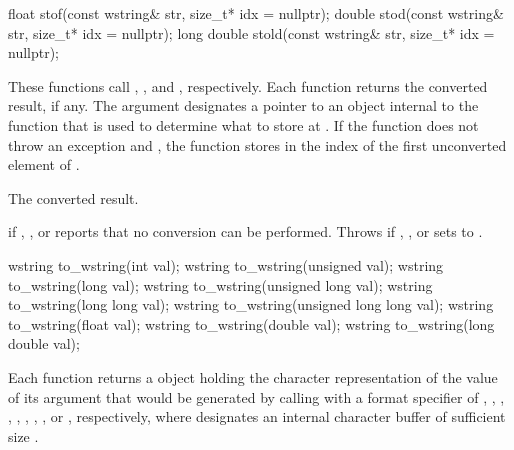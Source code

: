 %
%
%
\begin{itemdecl}
float stof(const wstring& str, size_t* idx = nullptr);
double stod(const wstring& str, size_t* idx = nullptr);
long double stold(const wstring& str, size_t* idx = nullptr);
\end{itemdecl}

\begin{itemdescr}
\pnum
\effects
These functions call ,
, and ,
respectively. Each function returns the converted
result, if any. The argument  designates a pointer to an object internal to
the function that is used to determine what to store at . If the function
does not throw an exception and , the function stores in 
the index of the first unconverted element of .

\pnum
\returns
The converted result.

\pnum
\throws
{} if , , or  reports that no
conversion can be performed. Throws  if , , or
 sets  to .
\end{itemdescr}

%
\begin{itemdecl}
wstring to_wstring(int val);
wstring to_wstring(unsigned val);
wstring to_wstring(long val);
wstring to_wstring(unsigned long val);
wstring to_wstring(long long val);
wstring to_wstring(unsigned long long val);
wstring to_wstring(float val);
wstring to_wstring(double val);
wstring to_wstring(long double val);
\end{itemdecl}

\begin{itemdescr}
\pnum
\returns
Each function returns a  object holding the character
representation of the value of its argument that would be generated by calling
 with a format specifier of
,
,
,
,
,
,
,
,
or , respectively, where  designates an
internal character buffer of sufficient size .
\end{itemdescr}

